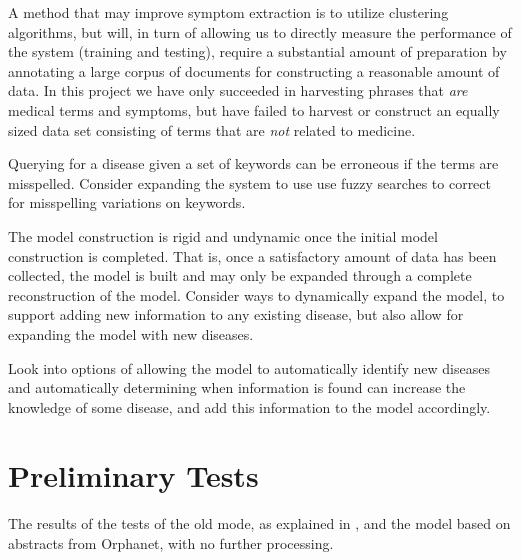\documentclass[10pt,letterpaper,final]{article}
\begin{document}
A method that may improve symptom extraction is to utilize clustering
algorithms, but will, in turn of allowing us to directly measure the
performance of the system (training and testing), require a substantial
amount of preparation by annotating a large corpus of documents for
constructing a reasonable amount of data. In this project we have only
succeeded in harvesting phrases that \textit{are} medical terms and
symptoms, but have failed to harvest or construct an equally sized data
set consisting of terms that are \textit{not} related to medicine.

Querying for a disease given a set of keywords can be erroneous if the
terms are misspelled. Consider expanding the system to use use fuzzy
searches to correct for misspelling variations on keywords.

The model construction is rigid and undynamic once the initial model
construction is completed. That is, once a satisfactory amount of data
has been collected, the model is built and may only be expanded through
a complete reconstruction of the model. Consider ways to dynamically
expand the model, to support adding new information to any existing
disease, but also allow for expanding the model with new diseases.

Look into options of allowing the model to automatically identify new
diseases and automatically determining when information is found can
increase the knowledge of some disease, and add this information to the
model accordingly.


\renewcommand\bibname{References}



\newpage
\appendix
\section{Preliminary Tests}
\label{app:preliminary_results}

The results of the tests of the old mode, as explained in
\cite{jensenandersen}, and the model based on abstracts from Orphanet,
with no further processing.


\end{document}
